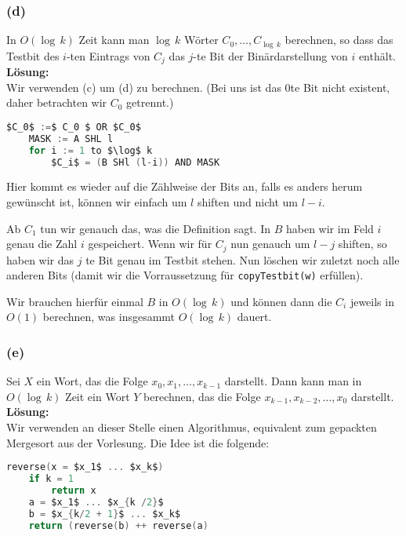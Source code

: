 \documentclass[11pt,a4paper,ngerman]{article}
\begin{document}
\subsubsection*{(d)}
In $O(\log \, k )$ Zeit kann man $\log \, k$ Wörter $C_0, \ldots, C_{\log \, k}$ berechnen, so dass das Testbit des $i$-ten Eintrags von $C_j$ das $j$-te Bit der Binärdarstellung von $i$ enthält.\\

\noindent\textbf{Lösung:}\\

Wir verwenden (c) um (d) zu berechnen. (Bei uns ist das $0$te Bit nicht existent, daher betrachten wir $C_0$ getrennt.)

\begin{lstlisting}[frame=single,language=C, morekeywords={:=,SHR,SHL,NOT,XOR,AND,OR,MUL}]
	$C_0$ :=$ C_0 $ OR $C_0$
	MASK := A SHL l
	for i := 1 to $\log$ k
		$C_i$ = (B SHl (l-i)) AND MASK
\end{lstlisting}

Hier kommt es wieder auf die Zählweise der Bits an, falls es anders herum gewünscht ist, können wir einfach um $l$ shiften und nicht um $l-i$.

Ab $C_1$ tun wir genauch das, was die Definition sagt. In $B$ haben wir im Feld $i$ genau die Zahl $i$ gespeichert. Wenn wir für $C_j$ nun genauch um $l-j$ shiften, so haben wir das $j$ te Bit genau im Testbit stehen. Nun löschen wir zuletzt noch alle anderen Bits (damit wir die Vorraussetzung für
\lstinline|copyTestbit(w)| erfüllen).

Wir brauchen hierfür einmal $B$ in $O(\log \, k)$ und können dann die $C_i$ jeweils in $O(1)$ berechnen, was insgesammt $O(\log \, k)$ dauert.

\subsubsection*{(e)}
Sei $X$ ein Wort, das die Folge $x_0, x_1, \ldots, x_{k-1}$ darstellt. Dann kann man in $O(\log \, k)$ Zeit ein Wort $Y$ berechnen, das die Folge $x_{k-1}, x_{k-2}, \ldots, x_0$ darstellt.\\

\noindent\textbf{Lösung:}\\

Wir verwenden an dieser Stelle einen Algorithmus, equivalent zum gepackten Mergesort aus der Vorlesung. Die Idee ist die folgende:
\begin{lstlisting}[frame=single,language=C]
reverse(x = $x_1$ ... $x_k$)
	if k = 1
		return x
	a = $x_1$ ... $x_{k /2}$
	b = $x_{k/2 + 1}$ ... $x_k$
	return (reverse(b) ++ reverse(a)
\end{lstlisting}
\end{document}

